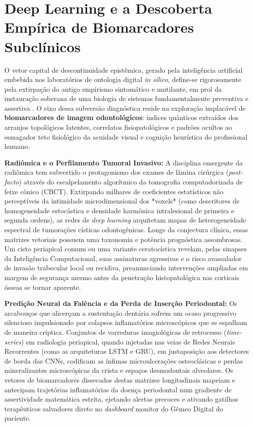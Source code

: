 \section{Deep Learning e a Descoberta Empírica de Biomarcadores Subclínicos}
\label{sec:ia-biomarcadores}

O vetor capital de descontinuidade epistêmica, gerado pela inteligência artificial embebida nos laboratórios de ontologia digital \textit{in silico}, define-se rigorosamente pela extirpação do antigo empirismo sintomático e mutilante, em prol da instauração soberana de uma biologia de sistemas fundamentalmente preventiva e assertiva \cite{nature2026digital}. O eixo dessa subversão diagnóstica reside na exploração implacável de \textbf{biomarcadores de imagem odontológicos}: índices quânticos extraídos dos arranjos topológicos latentes, correlatos fisiopatológicos e padrões ocultos ao esmagador teto fisiológico da acuidade visual e cognição heurística do profissional humano.

\textbf{Radiômica e o Perfilamento Tumoral Invasivo:} A disciplina emergente da radiômica tem subvertido o protagonismo dos exames de lâmina cirúrgica (\textit{post-facto}) através do escalpelamento algorítmico da tomografia computadorizada de feixe cônico (CBCT). Extirpando milhares de coeficientes estatísticos não perceptíveis da intimidade microdimensional dos *voxels* (como descritores de homogeneidade estocástica e densidade harmônica intralesional de primeira e segunda ordens), as redes de \textit{deep learning} arquitetam mapas de heterogeneidade espectral de tumorações císticas odontogênicas. Longe da conjectura clínica, essas matrizes vetoriais possuem uma taxonomia e potência prognóstica assombrosas. Um cisto periapical comum ou uma variante ceratocística revelam, pelas sinapses da Inteligência Computacional, suas assinaturas agressivas e o risco avassalador de invasão trabecular local ou recidiva, preanunciando intervenções ampliadas em margem de segurança mesmo antes da penetração histopatológica nas corticais ósseas se tornar aparente.

\textbf{Predição Neural da Falência e da Perda de Inserção Periodontal:} Os arcabouços que alicerçam a sustentação dentária sofrem um ocaso progressivo silencioso impulsionado por colapsos inflamatórios microscópicos que se espalham de maneira críptica. Conjuntos de varreduras imagiológicas de retrocesso (\textit{time-series}) em radiologia periapical, quando injetadas nas veias de Redes Neurais Recorrentes (como as arquiteturas LSTM e GRU), em justaposição aos detectores de borda das CNNs, codificam as ínfimas microulcerações osteoclásicas e perdas mineralizantes microscópicas da crista e espaços desmodontais alveolares. Os vetores de biomarcadores dissecados destas matrizes longitudinais mapeiam e antecipam trajetórias inflamatórias da doença periodontal num gradiente de assertividade matemática estrita, ejetando alertas precoces e ativando gatilhos terapêuticos salvadores direto no \textit{dashboard} monitor do Gêmeo Digital do paciente.

